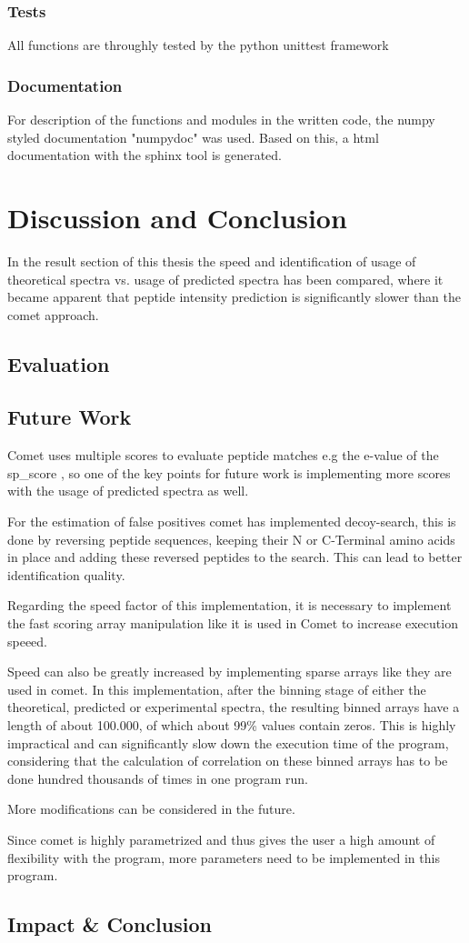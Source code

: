 \documentclass[11pt]{article}
\begin{document}
\subsubsection{Tests}
All functions are throughly tested by the python unittest framework

\subsubsection{Documentation}
For description of the functions and modules in the written code, the numpy styled documentation "numpydoc" was used. Based on this, a html documentation with the sphinx tool is generated.

\section{Discussion and Conclusion}
In the result section of this thesis the speed and identification of usage of theoretical spectra vs. usage of predicted spectra has been compared, where it became apparent that peptide intensity prediction is significantly slower than the comet approach.

\subsection{Evaluation}
\subsection{Future Work}
Comet uses multiple scores to evaluate peptide matches e.g the e-value of the sp\_score , so one of the key points for future work is implementing more scores with the usage of predicted spectra as well.

For the estimation of false positives comet has implemented decoy-search, this is done by reversing peptide sequences, keeping their N or C-Terminal amino acids in place and adding these reversed peptides to the search. This can lead to better identification quality.

Regarding the speed factor of this implementation, it is necessary to implement the fast scoring array manipulation like it is used in Comet to increase execution speeed.

Speed can also be greatly increased by implementing sparse arrays like they are used in comet. In this implementation, after the binning stage of either the theoretical, predicted or experimental spectra, the resulting binned arrays have a length of about 100.000, of which about 99\% values contain zeros. This is highly impractical and can significantly slow down the execution time of the program, considering that the calculation of correlation on these binned arrays has to be done hundred thousands of times in one program run.

More modifications can be considered in the future.

Since comet is highly parametrized and thus gives the user a high amount of flexibility with the program, more parameters need to be implemented in this program.

\subsection{Impact \& Conclusion}


\printbibliography
\end{document}
